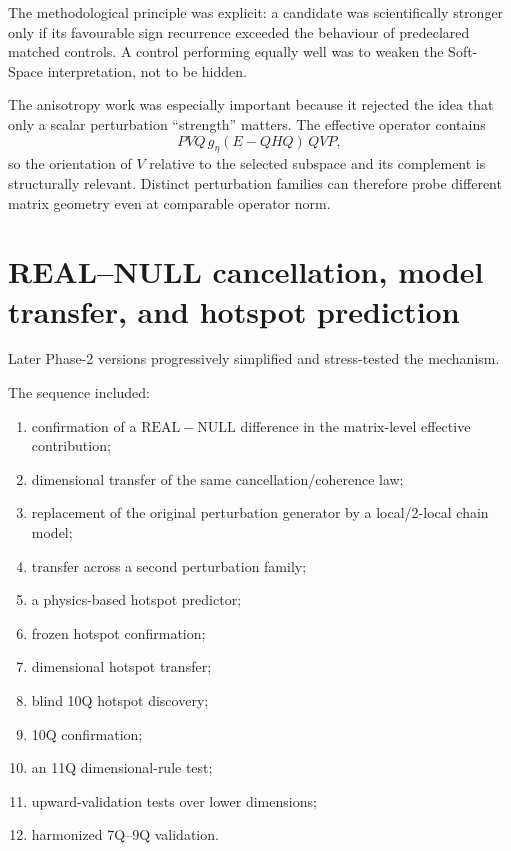 \documentclass[11pt,a4paper]{article}
\newcommand{\Real}{\mathrm{REAL}}
\newcommand{\Null}{\mathrm{NULL}}
\begin{document}
The methodological principle was explicit: a candidate was scientifically
stronger only if its favourable sign recurrence exceeded the behaviour of
predeclared matched controls.  A control performing equally well was to weaken
the Soft-Space interpretation, not to be hidden.

The anisotropy work was especially important because it rejected the idea that
only a scalar perturbation ``strength'' matters.  The effective operator
contains
\[
PVQ\,g_\eta(E-QHQ)\,QVP,
\]
so the orientation of \(V\) relative to the selected subspace and its
complement is structurally relevant.  Distinct perturbation families can
therefore probe different matrix geometry even at comparable operator norm.

\section{REAL--NULL cancellation, model transfer, and hotspot prediction}

Later Phase-2 versions progressively simplified and stress-tested the
mechanism.

The sequence included:

\begin{enumerate}[label=\arabic*.]
\item confirmation of a \(\Real-\Null\) difference in the matrix-level
      effective contribution;
\item dimensional transfer of the same cancellation/coherence law;
\item replacement of the original perturbation generator by a local/2-local
      chain model;
\item transfer across a second perturbation family;
\item a physics-based hotspot predictor;
\item frozen hotspot confirmation;
\item dimensional hotspot transfer;
\item blind 10Q hotspot discovery;
\item 10Q confirmation;
\item an 11Q dimensional-rule test;
\item upward-validation tests over lower dimensions;
\item harmonized 7Q--9Q validation.
\end{enumerate}
\end{document}
